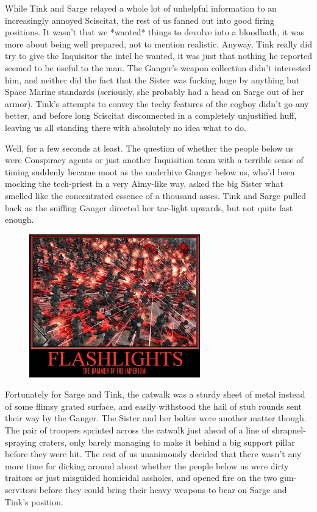 While Tink and Sarge relayed a whole lot of unhelpful information to an increasingly annoyed Sciscitat, the rest of us fanned out into good firing positions. 
It wasn't that we *wanted* things to devolve into a bloodbath, it was more about being well prepared, not to mention realistic. 
Anyway, Tink really did try to give the Inquisitor the intel he wanted, it was just that nothing he reported seemed to be useful to the man. 
The Ganger's weapon collection didn't interested him, and neither did the fact that the Sister was fucking huge by anything but Space Marine standards (seriously, she probably had a head on Sarge out of her armor). 
Tink's attempts to convey the techy features of the cogboy didn't go any better, and before long Sciscitat disconnected in a completely unjustified huff, leaving us all standing there with absolutely no idea what to do.

Well, for a few seconds at least. 
The question of whether the people below us were Conspiracy agents or just another Inquisition team with a terrible sense of timing suddenly became moot as the underhive Ganger below us, who'd been mocking the tech-priest in a very Aimy-like way, asked the big Sister what smelled like the concentrated essence of a thousand asses. 
Tink and Sarge pulled back as the sniffing Ganger directed her tac-light upwards, but not quite fast enough.

\begin{figure}
	\begin{center}
		\includegraphics[width=\figwidth]{pics/18/13.png}
	\end{center}
\end{figure}
Fortunately for Sarge and Tink, the catwalk was a sturdy sheet of metal instead of some flimsy grated surface, and easily withstood the hail of stub rounds sent their way by the Ganger. 
The Sister and her bolter were another matter though. 
The pair of troopers sprinted across the catwalk just ahead of a line of shrapnel-spraying craters, only barely managing to make it behind a big support pillar before they were hit. 
The rest of us unanimously decided that there wasn't any more time for dicking around about whether the people below us were dirty traitors or just misguided homicidal assholes, and opened fire on the two gun-servitors before they could bring their heavy weapons to bear on Sarge and Tink's position.

